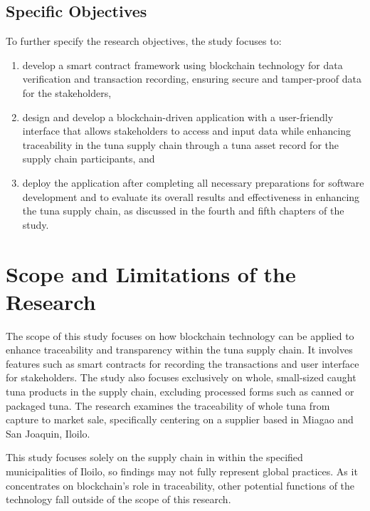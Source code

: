 \subsection{Specific Objectives}
\label{sec:specificobjectives}

To further specify the research objectives, the study focuses to:

\begin{enumerate}
	
	\item develop a smart contract framework using blockchain technology for data verification and transaction recording, ensuring secure and tamper-proof data for the stakeholders,
	\item design and develop a blockchain-driven application with a user-friendly interface that allows stakeholders to access and input data while enhancing traceability in the tuna supply chain through a tuna asset record for the supply chain participants, and 
	\item deploy the application after completing all necessary preparations for software development and to evaluate its overall results and effectiveness in enhancing the tuna supply chain, as discussed in the fourth and fifth chapters of the study.
\end{enumerate}


\section{Scope and Limitations of the Research}
\label{sec:scopelimitations}

The scope of this study focuses on how blockchain technology can be applied to enhance traceability and transparency within the tuna supply chain. It involves features such as smart contracts for recording the transactions and user interface for stakeholders. The study also focuses exclusively on whole, small-sized caught tuna products in the supply chain, excluding processed forms such as canned or packaged tuna. The research examines the traceability of whole tuna from capture to market sale, specifically centering on a supplier based in Miagao and San Joaquin, Iloilo. 

\noindent This study focuses solely on the supply chain in within the specified municipalities of Iloilo, so findings may not fully represent global practices. As it concentrates on blockchain's role in traceability, other potential functions of the technology fall outside of the scope of this research.



